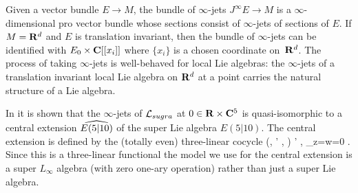 Given a vector bundle $E \to M$, the bundle of $\infty$-jets $J^\infty E \to M$ is a $\infty$-dimensional pro vector bundle whose sections consist of $\infty$-jets of sections of $E$.
If $M = \R^d$ and $E$ is translation invariant, then the bundle of $\infty$-jets can be identified with $E_0 \times \C[[x_i]]$ where $\{x_i\}$ is a chosen coordinate on~$\R^d$. 
The process of taking $\infty$-jets is well-behaved for local Lie algebras:
the $\infty$-jets of a translation invariant local Lie algebra on $\R^d$ at a point carries the natural structure of a Lie algebra.

In \cite{RSW} it is shown that the $\infty$-jets of $\cL_{sugra}$ at $0 \in \R \times \C^5$ is quasi-isomorphic to a central extension $\Hat{E(5|10)}$ of the super Lie algebra $E(5|10)$.
The central extension is defined by the (totally even) three-linear cocycle
\beqn\label{eqn:e510central}
(\mu, \mu' , \alpha) \mapsto \<\mu \wedge \mu' , \alpha\>_{z=w=0} \in \C .
\eeqn
Since this is a three-linear functional the model we use for the central extension is a super $L_\infty$ algebra (with zero one-ary operation) rather than just a super Lie algebra.





